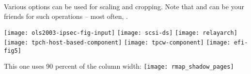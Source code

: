 
Various options can be used for scaling and cropping.  Note
that \textwidth and \columnwidth can be your friends for such
operations -- most often, \columnwidth.

\texttt{[image: ols2003-ipsec-fig-input]}
\texttt{[image: scsi-ds]}
\texttt{[image: relayarch]}
\texttt{[image: tpch-host-based-component]}
\texttt{[image: tpcw-component]}
\texttt{[image: efi-fig5]}

This one uses 90 percent of the column width:
\texttt{[image: rmap\_shadow\_pages]}

